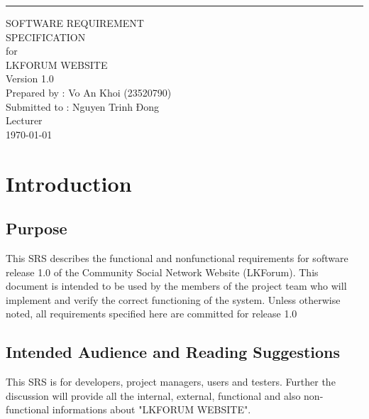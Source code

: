 \documentclass{scrreprt}
\date{}
\def\myversion{1.0 }
\begin{document}
\begin{flushright}
    \rule{16cm}{5pt}\vskip1cm
    \begin{bfseries}
        \Huge{SOFTWARE REQUIREMENT \\ SPECIFICATION}\\
        \vspace{1.5cm}
        for\\
        \vspace{1.5cm}
        LKFORUM WEBSITE\\
        \vspace{1.5cm}
        \LARGE{Version \myversion}\\
        \vspace{1.5cm}
        Prepared by : Vo An Khoi (23520790)\\
        \vspace{1.5cm}
        Submitted to : Nguyen Trinh Đong \\Lecturer\\
        \vspace{1.5cm}
        \today\\
    \end{bfseries}
\end{flushright}

\tableofcontents

\chapter{Introduction}

\section{Purpose}
This SRS describes the functional and nonfunctional requirements for software release 1.0 of the Community Social Network Website (LKForum). This document is intended to be used by the members of the project team who will implement and verify the correct functioning of the system. Unless otherwise noted, all requirements specified here are committed for release 1.0

\section{Intended Audience and Reading Suggestions}
This SRS is for developers, project managers, users and testers. Further the discussion will provide all the internal, external, functional and also non-functional informations about "LKFORUM WEBSITE".
\end{document}
